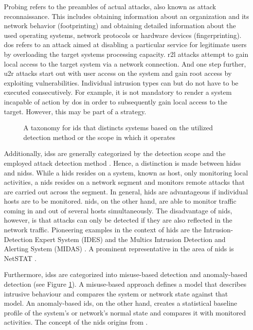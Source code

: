\documentclass[../../../main.tex]{subfiles}
\begin{document}
Probing refers to the preambles of actual attacks, also known as attack reconnaissance. This includes obtaining information about an organization and its network behavior (footprinting) and obtaining detailed information about the used operating systems, network protocols or hardware devices (fingerprinting). 
\newpage
\gls{dos} refers to an attack aimed at disabling a particular service for legitimate users by overloading the target systems processing capacity. \gls{r2l} attacks attempt to gain local access to the target system via a network connection. And one step further, \gls{u2r} attacks start out with user access on the system and gain root access by exploiting vulnerabilities. Individual intrusion types can but do not have to be executed consecutively. For example, it is not mandatory to render a system incapable of action by \gls{dos} in order to subsequently gain local access to the target. However, this may be part of a strategy.

\begin{figure}[b]
    \centering
    
    \caption{A taxonomy for \gls{ids} that distincts systems based on the utilized detection method or the  scope in which it operates}
    \label{fig:ids-taxonomy}
\end{figure}

Additionally, \glspl{ids} are generally categorized by the detection scope and the employed attack detection method \cite{milenkoski2015evaluating}. Hence, a distinction is made between \glspl{hids} and \glspl{nids}. While a \gls{hids} resides on a system, known as host, only monitoring local activities, a \gls{nids} resides on a network segment and monitors remote attacks that are carried out across the segment. In general, \gls{hids} are advantageous if individual hosts are to be monitored. \gls{nids}, on the other hand, are able to monitor traffic coming in and out of several hosts simultaneously. The disadvantage of \gls{nids}, however, is that attacks can only be detected if they are also reflected in the network traffic. Pioneering examples in the context of \gls{hids} are the Intrusion-Detection Expert System (IDES) \cite{lunt1992real} and the Multics Intrusion Detection and Alerting System (MIDAS) \cite{sebring1988expert}. A prominent representative in the area of \gls{nids} is NetSTAT \cite{vigna1998netstat} \cite{vigna1999netstat}.

Furthermore, \glspl{ids} are categorized into misuse-based detection and anomaly-based detection (see Figure \ref{fig:ids-taxonomy}). A misuse-based approach defines a model that describes intrusive behaviour and compares the system or network state against that model. An anomaly-based \gls{ids}, on the other hand, creates a statistical baseline profile of the system’s or network’s normal state and compares it with monitored activities. The concept of the \gls{nids} origins from \cite{denning1987intrusion}. 
\end{document}

